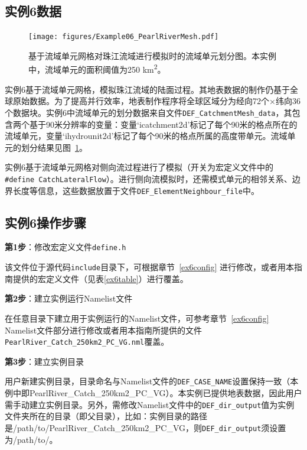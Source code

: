 \subsection{实例6数据}

\begin{figure}[htpb]
    \centering
    \texttt{[image: figures/Example06\_PearlRiverMesh.pdf]}
    \caption{基于流域单元网格对珠江流域进行模拟时的流域单元划分图。本实例中，流域单元的面积阈值为250 \unit{km^2}。}
    \label{fig:fig_pearlriver}
\end{figure}

实例6基于流域单元网格，模拟珠江流域的陆面过程。其地表数据的制作仍基于全球原始数据。为了提高并行效率，地表制作程序将全球区域分为经向72个×纬向36个数据块。实例6中流域单元的划分数据来自文件\texttt{DEF\_CatchmentMesh\_data}，其包含两个基于90米分辨率的变量：变量`icatchment2d'标记了每个90米的格点所在的流域单元，变量`ihydrounit2d'标记了每个90米的格点所属的高度带单元。流域单元的划分结果见图~\ref{fig:fig_pearlriver}。

实例6基于流域单元网格对侧向流过程进行了模拟（开关为宏定义文件中的\texttt{\#define CatchLateralFlow}）。进行侧向流模拟时，还需模式单元的相邻关系、边界长度等信息，这些数据放置于文件\texttt{DEF\_ElementNeighbour\_file}中。

\subsection{实例6操作步骤}

\textbf{第1步}：修改宏定义文件\texttt{define.h}

该文件位于源代码\texttt{include}目录下，可根据章节~\ref{ex6config} 进行修改，或者用本指南提供的宏定义文件（见表\ref{ex6table}）进行覆盖。

\bigskip
\textbf{第2步}：建立实例运行Namelist文件

在任意目录下建立用于实例运行的Namelist文件，可参考章节~\ref{ex6config} Namelist文件部分进行修改或者用本指南所提供的文件\texttt{PearlRiver\_Catch\_250km2\_PC\_VG.nml}覆盖。

\bigskip
\textbf{第3步}：建立实例目录

用户新建实例目录，目录命名与Namelist文件的\texttt{DEF\_CASE\_NAME}设置保持一致（本例中即PearlRiver\_Catch\_250km2\_PC\_VG）。本实例已提供地表数据，因此用户需手动建立实例目录。另外，需修改Namelist文件中的\texttt{DEF\_dir\_output}值为实例文件夹所在的目录（即父目录），比如：实例目录的路径是/path/to/PearlRiver\_Catch\_250km2\_PC\_VG，则\texttt{DEF\_dir\_output}须设置为/path/to/。

